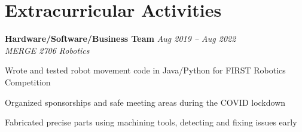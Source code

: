 \documentclass[11pt]{article}
\begin{document}
\section*{Extracurricular Activities}
\begin{small}

\noindent\textbf{Hardware/Software/Business Team} \hfill \textit{Aug 2019 -- Aug 2022} \\
\textit{MERGE 2706 Robotics}
\begin{compactitem}
    \item Wrote and tested robot movement code in Java/Python for FIRST Robotics Competition
    \item Organized sponsorships and safe meeting areas during the COVID lockdown
    \item Fabricated precise parts using machining tools, detecting and fixing issues early
\end{compactitem}

\end{small}


\end{document}
